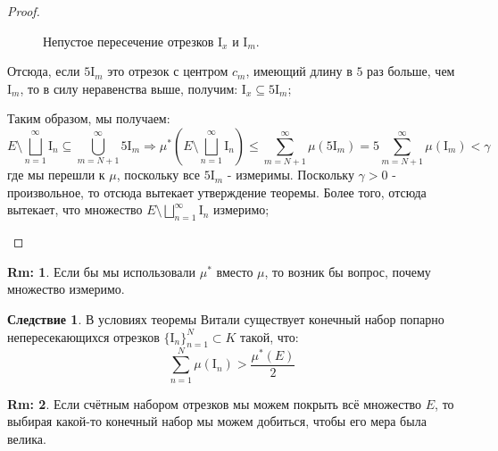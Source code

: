 \documentclass[12pt]{article}
\newcommand{\MI}{\mathrm{I}}
\theoremstyle{definition}
\newtheorem{rem}{Rm:}
\newtheorem{corollary}{Следствие}
\newcommand{\ddsum}[2]{\displaystyle\sum\limits_{#1}^{#2}}
\begin{document}
\begin{proof}
\begin{enumerate}[label=\arabic*)]
\begin{enumerate}[label = (\arabic*)]
\begin{figure}[H]
				\caption{Непустое пересечение отрезков $\MI_x$ и $\MI_m$.}
				\label{5_1}
			\end{figure}
			Отсюда, если $5\MI_m$ это отрезок с центром $c_m$, имеющий длину в $5$ раз больше, чем $\MI_m$, то в силу неравенства выше, получим: $\MI_x \subseteq 5\MI_m$;
		\end{enumerate}
		Таким образом, мы получаем:
		$$
			E \setminus \bigsqcup\limits_{n = 1}^{\infty}\MI_{n} \subseteq \bigcup\limits_{m = N+ 1}^{\infty}5\MI_m \Rightarrow \mu^*\left(E \setminus \bigsqcup\limits_{n = 1}^{\infty}\MI_{n}\right) \leq \ddsum{m = N + 1}{\infty}\mu(5\MI_m) = 5 \ddsum{m = N + 1}{\infty}\mu(\MI_m) < \gamma
		$$
		где мы перешли к $\mu$, поскольку все $5\MI_m$ - измеримы. Поскольку $\gamma > 0$ - произвольное, то отсюда вытекает утверждение теоремы. Более того, отсюда вытекает, что множество $E \setminus \bigsqcup\limits_{n = 1}^{\infty}\MI_{n}$ измеримо;
	\end{enumerate}
\end{proof}
\begin{rem}
	Если бы мы использовали $\mu^*$ вместо $\mu$, то возник бы вопрос, почему множество измеримо.
\end{rem}

\begin{corollary}
	В условиях теоремы Витали существует конечный набор попарно непересекающихся отрезков $\{\MI_n\}_{n = 1}^{N} \subset K $ такой, что:
	$$
		\ddsum{n = 1}{N}\mu(\MI_n) > \dfrac{\mu^*(E)}{2}
	$$
\end{corollary}
\begin{rem}
	Если счётным набором отрезков мы можем покрыть всё множество $E$, то выбирая какой-то конечный набор мы можем добиться, чтобы его мера была велика.
\end{rem}
\end{document}
